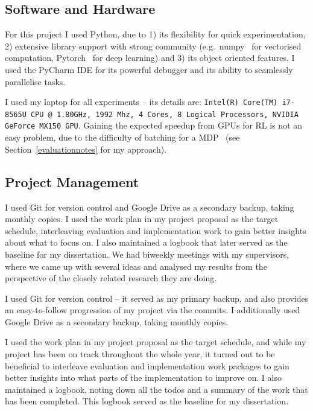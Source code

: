 \subsection{Software and Hardware}


For this project I used Python, due to 1) its flexibility for quick experimentation, 2) extensive library support with strong community (e.g.\ numpy~\cite{harris2020numpy} for vectorised computation, Pytorch~\cite{paszke2019pytorch} for deep learning) and 3) its object oriented features. I used the PyCharm IDE for its powerful debugger and its ability to seamlessly parallelise tasks.


I used my laptop for all experiments -- its details are: \texttt{Intel(R) Core(TM) i7-8565U CPU @ 1.80GHz, 1992 Mhz, 4 Cores, 8 Logical Processors, NVIDIA GeForce MX150 GPU}. Gaining the expected speedup from GPUs for RL is not an easy problem, due to the difficulty of batching for a MDP~\cite{stooke2018gpudeepRL} (see Section~\ref{evaluationnotes} for my approach).


\subsection{Project Management}

I used Git for version control and Google Drive as a secondary backup, taking monthly copies. I used the work plan in my project proposal as the target schedule, interleaving evaluation and implementation work to gain better insights about what to focus on. I also maintained a logbook that later served as the baseline for my dissertation. We had biweekly meetings with my supervisors, where we came up with several ideas and analysed my results from the perspective of the closely related research they are doing.

\iffalse
I used Git for version control -- it served as my primary backup, and also provides an easy-to-follow progression of my project via the commits. I additionally used Google Drive as a secondary backup, taking monthly copies. 

I used the work plan in my project proposal as the target schedule, and while my project has been on track throughout the whole year, it turned out to be beneficial to interleave evaluation and implementation work packages to gain better insights into what parts of the implementation to improve on. I also maintained a logbook, noting down all the todos and a summary of the work that has been completed. This logbook served as the baseline for my dissertation.

